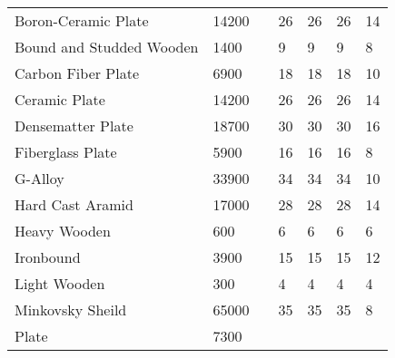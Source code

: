 \documentclass[twoside]{book}
\begin{document}
\begin{longtable}{p{1.25in}llp{3em}p{3em}p{3em}p{3em}}
  \raggedright
           Boron-Ceramic Plate 
  &
   14200 
  &
  
  &
   26 
  &
   26 
  &
   26 
  &
   14 
  \tabularnewline
      
  \raggedright
           Bound and Studded Wooden
           
  &
   1400 
  &
  
  &
   9 
  &
   9 
  &
   9 
  &
   8 
  \tabularnewline
      
  \raggedright
           Carbon Fiber Plate 
  &
   6900 
  &
  
  &
   18 
  &
   18 
  &
   18 
  &
   10 
  \tabularnewline
      
  \raggedright
           Ceramic Plate 
  &
   14200 
  &
  
  &
   26 
  &
   26 
  &
   26 
  &
   14 
  \tabularnewline
      
  \raggedright
           Densematter Plate 
  &
   18700 
  &
  
  &
   30 
  &
   30 
  &
   30 
  &
   16 
  \tabularnewline
      
  \raggedright
           Fiberglass Plate 
  &
   5900 
  &
  
  &
   16 
  &
   16 
  &
   16 
  &
   8 
  \tabularnewline
      
  \raggedright
           G-Alloy 
  &
   33900 
  &
  
  &
   34 
  &
   34 
  &
   34 
  &
   10 
  \tabularnewline
      
  \raggedright
           Hard Cast Aramid 
  &
   17000 
  &
  
  &
   28 
  &
   28 
  &
   28 
  &
   14 
  \tabularnewline
      
  \raggedright
           Heavy Wooden 
  &
   600 
  &
  
  &
   6 
  &
   6 
  &
   6 
  &
   6 
  \tabularnewline
      
  \raggedright
           Ironbound 
  &
   3900 
  &
  
  &
   15 
  &
   15 
  &
   15 
  &
   12 
  \tabularnewline
      
  \raggedright
           Light Wooden 
  &
   300 
  &
  
  &
   4 
  &
   4 
  &
   4 
  &
   4 
  \tabularnewline
      
  \raggedright
           Minkovsky Sheild 
  &
   65000 
  &
  
  &
   35 
  &
   35 
  &
   35 
  &
   8 
  \tabularnewline
      
  \raggedright
           Plate 
  &
   7300 
  &
  

\end{longtable}
\end{document}

